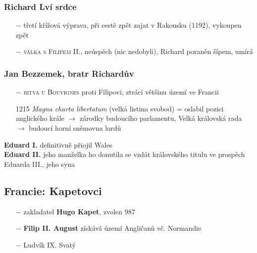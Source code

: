 \documentclass{article}
\begin{document}
\subsubsection*{Richard Lví srdce}
\begin{itemize}
    \vspace{-0.5em}
    \setlength\itemsep{0.15em}
    \item[$-$] třetí křížová výprava, při cestě zpět zajat v Rakousku (1192), vykoupen zpět
    \item[$-$] \textsc{válka s Filipem II.}, neúspěch (nic nedobyli), Richard poraněn šípem, umírá
\end{itemize}
\subsubsection*{Jan Bezzemek, bratr Richardův}
\begin{itemize}
    \vspace{-0.5em}
    \setlength\itemsep{0.15em}
    \item[$-$] \textsc{bitva u Bouvignes} proti Filipovi, ztrácí většinu území ve Francii
    \item[1215] \textit{Magna charta libertatum} (velká listina svobod) = oslabil pozici anglického krále $\rightarrow$ zárodky budoucího parlamentu, Velká královská rada $\rightarrow$ budoucí horní sněmovna lordů
\end{itemize}
\textbf{Eduard I.} definitivně přiojil Wales\\
\textbf{Eduard II.} jeho manželka ho donutila se vzdát královského titulu ve prospěch Eduarda III., jeho syna


\subsection*{Francie: Kapetovci}
\begin{itemize}
    \vspace{-0.5em}
    \setlength\itemsep{0.15em}
    \item[$-$] zakladatel \textbf{Hugo Kapet}, zvolen 987
    \item[$-$] \textbf{Filip II. August} získává území Angličanů vč. Normandie
    \item[$-$] Ludvík IX. Svatý
\end{itemize}
\end{document}
